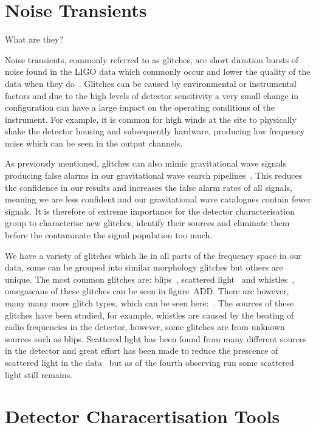 \section{Noise Transients}

What are they?

Noise transients, commonly referred to as glitches, are short duration bursts of noise found in the LIGO data which commonly occur and lower the quality of the data when they do~\cite{LIGO_data_quality:2015}. Glitches can be caused by environmental or instrumental factors and due to the high levels of detector sensitivity a very small change in configuration can have a large impact on the operating conditions of the instrument. For example, it is common for high winds at the site to physically shake the detector housing and subsequently hardware, producing low frequency noise which can be seen in the output channels. 

As previously mentioned, glitches can also mimic gravitational wave signals producing false alarms in our gravitational wave search pipelines~\cite{GWMimicking:2010}. This reduces the confidence in our results and increases the false alarm rates of all signals, meaning we are less confident and our gravitational wave catalogues contain fewer signals. It is therefore of extreme importance for the detector characterisation group to characterise new glitches, identify their sources and eliminate them before the contaminate the signal population too much.

We have a variety of glitches which lie in all parts of the frequency space in our data, some can be grouped into similar morphology glitches but others are unique. The most common glitches are: blips~\cite{blips:2019}, scattered light~\cite{ArchEnemy:2023} and whistles~\cite{glitschen:2021}, omegascans of these glitches can be seen in figure~ADD. There are however, many many more glitch types, which can be seen here:~\cite{gravityspy:2017}. The sources of these glitches have been studied, for example, whistles are caused by the beating of radio frequencies in the detector, however, some glitches are from unknown sources such as blips. Scattered light has been found from many different sources in the detector and great effort has been made to reduce the prescence of scattered light in the data~\cite{reducing_scattering:2020} but as of the fourth observing run some scattered light still remains.
%
%
\section{Detector Characertisation Tools}

